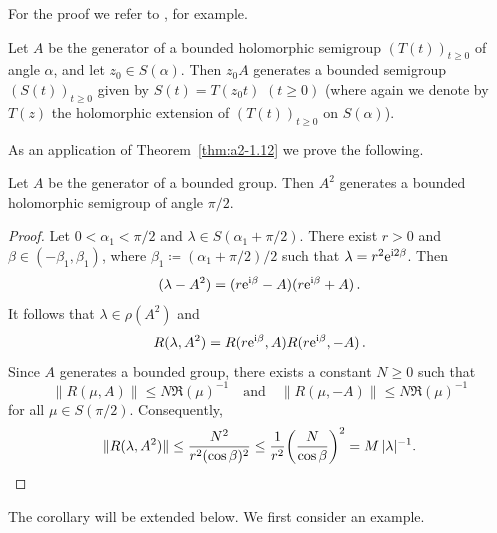 For the proof we refer to \textcite{davies:1980}, for example.
\begin{remark*}\label{rem:a2-1.6-kgk}
Let $A$ be the generator of a bounded holomorphic semigroup $(T(t))_{t \geq 0}$ 
of angle $\alpha$, and let $z_{0} \in S(\alpha)$.
Then $z_{0}A$ generates a bounded semigroup 
$(S(t))_{t \geq 0}$ given by $S(t) = T(z_{0}t)$  $(t \geq 0)$ (where again we denote by $T(z)$ the holomorphic extension of\/ $(T(t))_{t \geq 0}$ on $S(\alpha)$).
\end{remark*}
As an application of Theorem~\ref{thm:a2-1.12}  we prove the following.
\begin{corollary}\label{cor:a2-1.13}
Let $A$ be the generator of a bounded group.
Then $A^{2}$ generates a bounded holomorphic semigroup of angle $\pi/2$.
\end{corollary}
\begin{proof}
Let $0 < \alpha_{1} < \pi/2$ and $\lambda \in S(\alpha_{1} + \pi/2)$.
There exist $r > 0$ and $\beta \in (-\beta_{1},\beta_{1})$,
where $\beta_{1} \coloneq (\alpha_{1} + \pi/2)/2$
such that $\lambda = r^{2}\mathrm{e}^{\mathrm{i} 2\beta}$.
Then 
\[
(\lambda - A^{2}) = (r\mathrm{e}^{\mathrm{i}\beta} - A)(r\mathrm{e}^{\mathrm{i}\beta} + A) \, .
\] 
It follows that $\lambda \in \rho(A^{2})$ and 
\begin{equation}\label{eq:a2-1.7}
    R(\lambda,A^{2}) = R(r\mathrm{e}^{\mathrm{i}\beta},A)R(r\mathrm{e}^{\mathrm{i}\beta},-A) \, .
\end{equation}
Since $A$ generates a bounded group, there exists a constant $N \geq 0$ such that 
%
\[
	\|R(\mu,A)\| \leq N\Re(\mu)^{-1} \quad \text{and} \quad \|R(\mu,-A)\| \leq N \Re(\mu)^{-1} 
\]
%
for all $\mu \in S(\pi/2)$.
Consequently, 
%
\begin{equation*}
	\|R(\lambda,A^{2})\| \leq \frac{N^{2}}{r^{2} (\cos\beta)^{2}} 
		\leq \frac{1}{r^{2}}\mleft( \frac{N}{\cos\beta} \mright)^{2} = M\,|\lambda|^{-1} .
\qedhere
\end{equation*}
%
\end{proof}
The corollary will be extended below.
We first consider an example.
